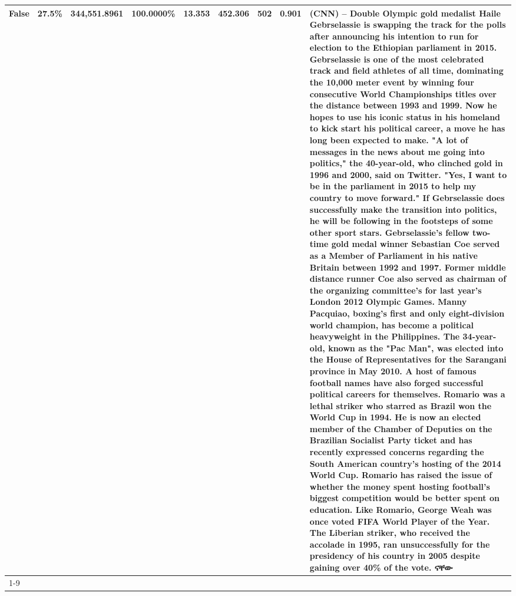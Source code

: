 \begin{table}[H]
{\begin{tabular}{lllrlllll}
False & 27.5\% & 344,551.8961 & \bfseries \color{red} 100.0000\% & 13.353 & 452.306 & 502 & 0.901 & (CNN) -- Double Olympic gold medalist Haile Gebrselassie is swapping the track for the polls after announcing his intention to run for election to the Ethiopian parliament in 2015. Gebrselassie is one of the most celebrated track and field athletes of all time, dominating the 10,000 meter event by winning four consecutive World Championships titles over the distance between 1993 and 1999. Now he hopes to use his iconic status in his homeland to kick start his political career, a move he has long been expected to make. "A lot of messages in the news about me going into politics," the 40-year-old, who clinched gold in 1996 and 2000, said on Twitter. "Yes, I want to be in the parliament in 2015 to help my country to move forward." If Gebrselassie does successfully make the transition into politics, he will be following in the footsteps of some other sport stars. Gebrselassie's fellow two-time gold medal winner Sebastian Coe served as a Member of Parliament in his native Britain between 1992 and 1997. Former middle distance runner Coe also served as chairman of the organizing committee's for last year's London 2012 Olympic Games. Manny Pacquiao, boxing's first and only eight-division world champion, has become a political heavyweight in the Philippines. The 34-year-old, known as the "Pac Man", was elected into the House of Representatives for the Sarangani province in May 2010. A host of famous football names have also forged successful political careers for themselves. Romario was a lethal striker who starred as Brazil won the World Cup in 1994. He is now an elected member of the Chamber of Deputies on the Brazilian Socialist Party ticket and has recently expressed concerns regarding the South American country's hosting of the 2014 World Cup. Romario has raised the issue of whether the money spent hosting football's biggest competition would be better spent on education. Like Romario, George Weah was once voted FIFA World Player of the Year. The Liberian striker, who received the accolade in 1995, ran unsuccessfully for the presidency of his country in 2005 despite gaining over 40\% of the vote. ናቸው \\
\cline{1-9}

\end{tabular}}
\end{table}
